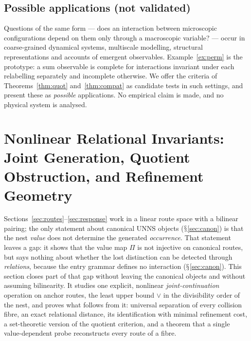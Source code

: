 \documentclass[11pt,a4paper]{article}
\renewcommand{\S}{\ensuremath{\mathsection}}
\newcommand{\vj}{\mathbin{\vee}}
\theoremstyle{plain}
\theoremstyle{definition}
\begin{document}
\subsection{Possible applications (not validated)}
Questions of the same form --- does an interaction between microscopic configurations depend on them only through a macroscopic variable? --- occur in coarse-grained dynamical systems, multiscale modelling, structural representations and accounts of emergent observables. Example~\ref{ex:perm} is the prototype: a sum observable is complete for interactions invariant under each relabelling separately and incomplete otherwise. We offer the criteria of Theorems~\ref{thm:quot} and~\ref{thm:compat} as candidate tests in such settings, and present these as \emph{possible} applications. No empirical claim is made, and no physical system is analysed.

\section{Nonlinear Relational Invariants: Joint Generation, Quotient Obstruction, and Refinement Geometry}\label{sec:nonlinear}
Sections~\ref{sec:routes}--\ref{sec:response} work in a linear route space with a bilinear pairing; the only statement about canonical UNNS objects (\S\ref{sec:canon}) is that the nest \emph{value} does not determine the generated \emph{occurrence}.
That statement leaves a gap: it shows that the value map $\Pi$ is not injective on canonical routes, but says nothing about whether the lost distinction can be detected through \emph{relations}, because the entry grammar defines no interaction (\S\ref{sec:canon}).
This section closes part of that gap without leaving the canonical objects and without assuming bilinearity.
It studies one explicit, nonlinear \emph{joint-continuation} operation on anchor routes, the least upper bound $\vj$ in the divisibility order of the nest, and proves what follows from it: universal separation of every collision fibre, an exact relational distance, its identification with minimal refinement cost, a set-theoretic version of the quotient criterion, and a theorem that a single value-dependent probe reconstructs every route of a fibre.
\end{document}
